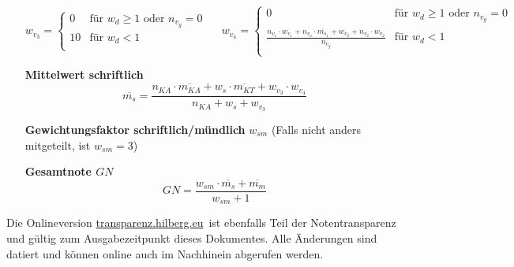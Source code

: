 \documentclass{article}
\newcommand{\onlinedoc}{\href{https://transparenz.hilberg.eu}{transparenz.hilberg.eu}}
\begin{document}
\begin{enumerate}[label=\textbf{\textbullet}, align=left, leftmargin=*]
	\[
	w_{v_3} =
	\begin{cases}
		0 & \text{für }  w_{d} \geq 1 \text{ oder } n_{v_g}=0 \\
		10 & \text{für }    w_{d} < 1 \\
	\end{cases}
	\,\,\,\,\,\,\,\,
	w_{v_4} =
	\begin{cases}
		0 & \text{für }  w_{d} \geq 1 \text{ oder } n_{v_g}=0 \\
		\frac{n_{v_1} \cdot w_{v_1} + n_{v_o} \cdot \overline{m_{s_1}} + w_{v_2} + n_{v_2} \cdot w_{v_2}}{n_{v_g}} & \text{für }    w_{d} < 1 \\
	\end{cases}
	\]	
	\item[\textbf{Mittelwert schriftlich}]
	\[
	\overline{m_{s}} = \frac{ n_{KA} \cdot \overline{m_{KA}} + w_s \cdot \overline{m_{KT}} +w_{v_3} \cdot w_{v_4}   }{n_{KA} + w_s + w_{v_3}}
	\]
	\item[\textbf{Gewichtungsfaktor schriftlich/mündlich}] $w_{sm}$ (Falls nicht anders mitgeteilt, ist $w_{sm}=3$)
	\item[\textbf{Gesamtnote $GN$}]
	\[
	GN = \frac{w_{sm} \cdot \overline{m_{s}} + \overline{m_{m}}}{w_{sm}+1}
	\]
\end{enumerate}

\renewcommand\refname{\footnotesize Mathematische Notationen}
\renewcommand{\bibname}{Quellen}

\vfill

\begingroup
\tiny


\endgroup

{\tiny Die Onlineversion \onlinedoc \, ist ebenfalls Teil der Notentransparenz und gültig zum Ausgabezeitpunkt dieses Dokumentes. Alle Änderungen sind datiert und können online auch im Nachhinein abgerufen werden.}
\end{document}
